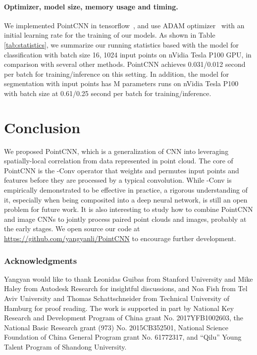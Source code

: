 \documentclass{article}
\newcommand{\githuburl}{https://github.com/yangyanli/PointCNN}
\begin{document}
\paragraph{Optimizer, model size, memory usage and timing.} We implemented PointCNN in tensorflow~\cite{tensorflow}, and use ADAM optimizer~\cite{Kingma_ICLR14} with an initial learning rate  for the training of our models. As shown in Table \ref{tab:statistics}, we summarize our running statistics based with the model for classification with batch size 16, 1024 input points on nVidia Tesla P100 GPU, in comparison with several other methods. PointCNN achieves 0.031/0.012 second per batch for training/inference on this setting. In addition, the model for segmentation with  input points has M parameters runs on nVidia Tesla P100 with batch size  at 0.61/0.25 second per batch for training/inference. \section{Conclusion}
\label{sec:conclusion}

We proposed PointCNN, which is a generalization of CNN into leveraging spatially-local correlation from data represented in point cloud. The core of PointCNN is the -Conv operator that weights and permutes input points and features before they are processed by a typical convolution. While -Conv is empirically demonstrated to be effective in practice, a rigorous understanding of it, especially when being composited into a deep neural network, is still an open problem for future work. It is also interesting to study how to combine PointCNN and image CNNs to jointly process paired point clouds and images, probably at the early stages. We open source our code at \href{\githuburl}{\githuburl} to encourage further development. 

\subsubsection*{Acknowledgments}
Yangyan would like to thank Leonidas Guibas from Stanford University and Mike Haley from Autodesk Research for insightful discussions, and Noa Fish from Tel Aviv University and Thomas Schattschneider from Technical University of Hamburg for proof reading. The work is supported in part by National Key Research and Development Program of China grant No. 2017YFB1002603, the National Basic Research grant (973)  No. 2015CB352501, National Science Foundation of China General Program grant No. 61772317, and ``Qilu'' Young Talent Program of Shandong University.
\end{document}
